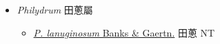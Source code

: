 
  \begin{itemize}
 \item[] \textit{Philydrum} 田蔥屬
                    
  \begin{itemize}
        \item[] \href{http://www.theplantlist.org/tpl1.1/search?q=Philydrum+lanuginosum}{\textit{P. lanuginosum} Banks \& Gaertn.}   田蔥 NT
  \end{itemize}
  \end{itemize}
